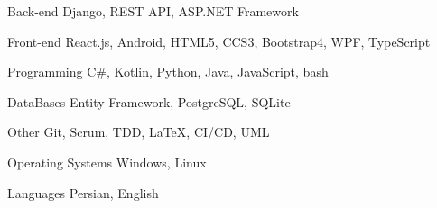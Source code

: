 

\begin{cvskills}

  \cvskill
  {Back-end} %
  {Django, REST API, ASP.NET Framework} %

  \cvskill
  {Front-end} %
  {React.js, Android, HTML5, CCS3, Bootstrap4, WPF, TypeScript} %

  \cvskill
  {Programming} %
  {C\#, Kotlin, Python, Java, JavaScript, bash} %

  \cvskill
  {DataBases} %
  {Entity Framework, PostgreSQL, SQLite} %


  \cvskill
  {Other} %
  {Git, Scrum, TDD, \LaTeX, CI/CD, UML} %


  \cvskill
  {Operating Systems} %
  {Windows, Linux} %


  \cvskill
  {Languages} %
  {Persian, English} %


\end{cvskills}
